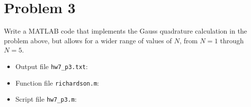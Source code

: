 \section{Problem 3}%
\label{sec:problem_3}
Write a MATLAB code that implements the Gauss quadrature calculation in the problem above, but allows for a wider range of values of $N$, from $N = 1$ through $N = 5$.
\begin{solution}
  \quad
  \begin{itemize}
  \item Output file \verb|hw7_p3.txt|:
    
  \item Function file \verb|richardson.m|:
    
  \item Script file \verb|hw7_p3.m|:
    
  \end{itemize}
\end{solution}

